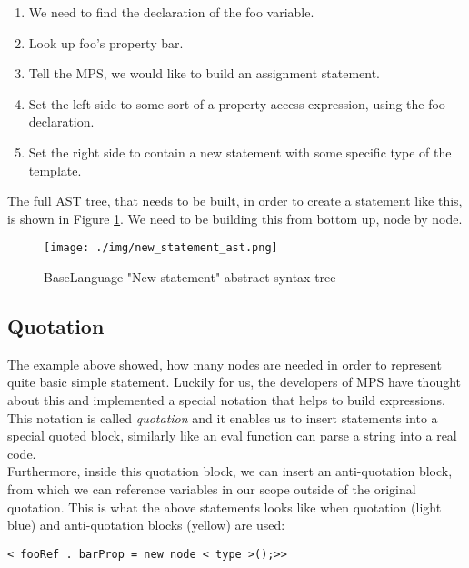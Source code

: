 \begin{enumerate}
	\item We need to find the declaration of the foo variable.
	\item Look up foo's property bar.
	\item Tell the MPS, we would like to build an assignment statement.
	\item Set the left side to some sort of a property-access-expression, using the foo declaration.
	\item Set the right side to contain a new statement with some specific type of the template.
\end{enumerate}

The full AST tree, that needs to be built, in order to create a statement like this, is shown in Figure \ref{fig:new_ast}.
We need to be building this from bottom up, node by node.

\begin{figure}[h]
	\centering
	\hspace*{-18mm}
	\texttt{[image: ./img/new\_statement\_ast.png]}
	\caption{BaseLanguage "New statement" abstract syntax tree}
	\label{fig:new_ast}
\end{figure}

\subsection{Quotation}
The example above showed, how many nodes are needed in order to represent quite basic simple statement.
Luckily for us, the developers of MPS have thought about this and implemented a special notation that helps to build expressions.
This notation is called \textit{quotation} and it enables us to insert statements into a special quoted block, similarly like an eval function can parse a string into a real code.
\\

Furthermore, inside this quotation block, we can insert an anti-quotation block, from which we can reference variables in our scope outside of the original quotation.
This is what the above statements looks like when quotation (light blue) and anti-quotation blocks (yellow) are used:

\begin{center}
	\texttt{\colorbox{cyan!30}{<}\lexerrule{\%(} fooRef \lexerrule{)\%}.\lexerrule{\%(} barProp \lexerrule{)\%} = new node <\lexerrule{\textasciicircum(} type \lexerrule{)\textasciicircum}>();>\colorbox{cyan!30}{>}}
\end{center}

